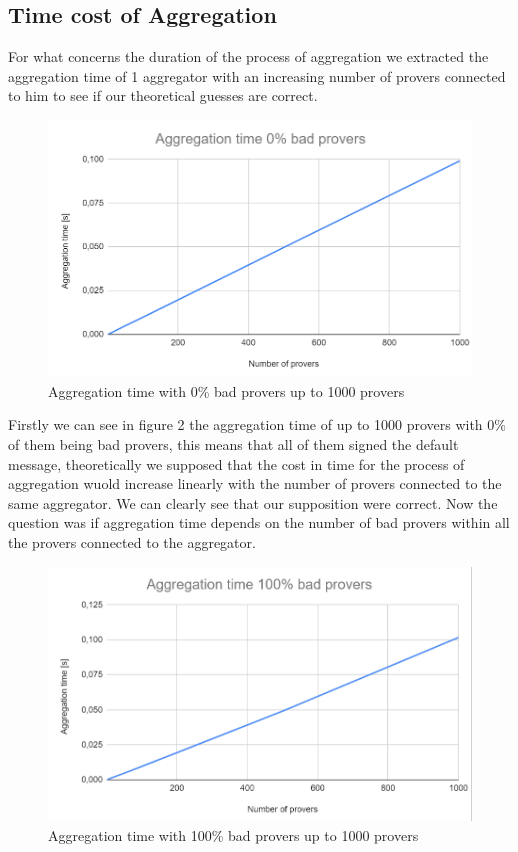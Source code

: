 \documentclass[10pt, a4paper, twocolumn]{article} %
\begin{document}
\subsection{Time cost of Aggregation}
For what concerns the duration of the process of aggregation we extracted the aggregation time of 1 aggregator with an increasing number of provers connected to him to see if our theoretical guesses are correct.
\begin{figure}
	\includegraphics[width=\linewidth]{images/aggregation_0.png} %
	\caption{Aggregation time with 0\% bad provers up to 1000 provers} %
	\label{bear} %
\end{figure}

Firstly we can see in figure 2 the aggregation time of up to 1000 provers with 0\% of them being bad provers, this means that all of them signed the default message, theoretically we supposed that the cost in time 
for the process of aggregation wuold increase linearly with the number of provers connected to the same aggregator. We can clearly see that our supposition were correct.
Now the question was if aggregation time depends on the number of bad provers within all the provers connected to the aggregator.\\

\begin{figure}
	\includegraphics[width=\linewidth]{images/aggregation_100.png} %
	\caption{Aggregation time with 100\% bad provers up to 1000 provers} %
	\label{bear} %
\end{figure}
\end{document}
